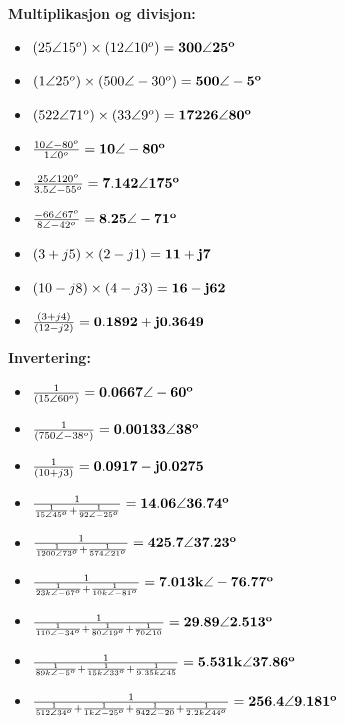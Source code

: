 \noindent
{\bf Multiplikasjon og divisjon:}

\begin{itemize}
\item{} $(25 \angle 15^o) \times (12 \angle 10^o) = {\bf 300 \angle 25^o}$
\item{} $(1 \angle 25^o) \times (500 \angle -30^o) = {\bf 500 \angle -5^o}$
\item{} $(522 \angle 71^o) \times (33 \angle 9^o) = {\bf 17226 \angle 80^o}$
\item{} ${{10 \angle -80^o} \over {1 \angle 0^o}} = {\bf 10 \angle -80^o}$
\item{} ${{25 \angle 120^o} \over {3.5 \angle -55^o}} = {\bf 7.142 \angle 175^o}$
\item{} ${{-66 \angle 67^o} \over {8 \angle -42^o}} = {\bf 8.25 \angle -71^o}$
\item{} $(3 + j5) \times (2 - j1) = {\bf 11 + j7}$
\item{} $(10 - j8) \times (4 - j3) = {\bf 16 - j62}$
\item{} ${(3 + j4) \over (12 - j2)} = {\bf 0.1892 + j0.3649}$
\end{itemize}

\noindent
{\bf Invertering:}

\begin{itemize}
\item{} ${1 \over (15 \angle 60^o)} = {\bf 0.0667 \angle -60^o}$
\item{} ${1 \over (750 \angle -38^o)} = {\bf 0.00133 \angle 38^o}$
\item{} ${1 \over (10 + j3)} = {\bf 0.0917 -j0.0275}$
\item{} ${1 \over {1 \over {15 \angle 45^o}} + {1 \over {92 \angle -25^o}}} = {\bf 14.06 \angle 36.74^o}$
\item{} ${1 \over {1 \over {1200 \angle 73^o}} + {1 \over {574 \angle 21^o}}} = {\bf 425.7 \angle 37.23^o}$
\item{} ${1 \over {1 \over {23k \angle -67^o}} + {1 \over {10k \angle -81^o}}} = {\bf 7.013k \angle -76.77^o}$
\item{} ${1 \over {1 \over {110 \angle -34^o}} + {1 \over {80 \angle 19^o}} + {1 \over {70 \angle 10}}} = {\bf 29.89 \angle 2.513^o}$
\item{} ${1 \over {1 \over {89k \angle -5^o}} + {1 \over {15k \angle 33^o}} + {1 \over {9.35k \angle 45}}} = {\bf 5.531k \angle 37.86^o}$
\item{} ${1 \over {1 \over {512 \angle 34^o}} + {1 \over {1k \angle -25^o}} + {1 \over {942 \angle -20}} + {1 \over {2.2k \angle 44^o}}} = {\bf 256.4 \angle 9.181^o}$
\end{itemize}

